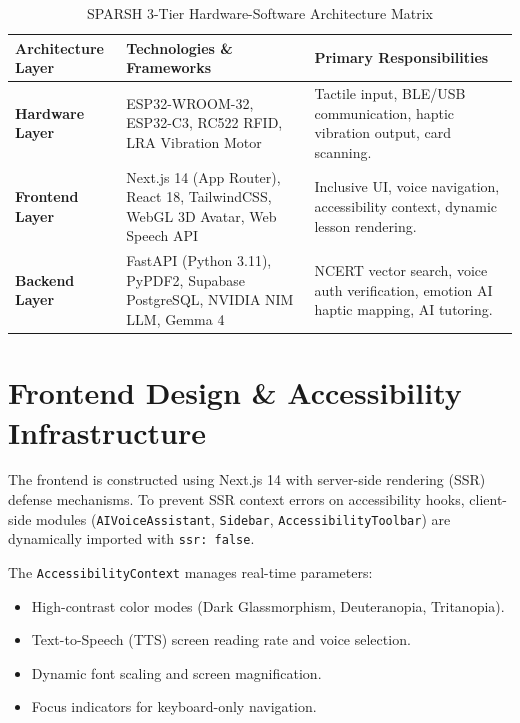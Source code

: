 \documentclass[12pt,a4paper]{report}
\begin{document}
\begin{table}[htbp]
    \centering
    \caption{SPARSH 3-Tier Hardware-Software Architecture Matrix}
    \vspace{0.2cm}
    \renewcommand{\arraystretch}{1.3}
    \begin{tabular}{|p{}|p{}|p{}|}
        \hline
        \textbf{Architecture Layer} & \textbf{Technologies \& Frameworks} & \textbf{Primary Responsibilities} \\ \hline
        \textbf{Hardware Layer} & ESP32-WROOM-32, ESP32-C3, RC522 RFID, LRA Vibration Motor & Tactile input, BLE/USB communication, haptic vibration output, card scanning. \\ \hline
        \textbf{Frontend Layer} & Next.js 14 (App Router), React 18, TailwindCSS, WebGL 3D Avatar, Web Speech API & Inclusive UI, voice navigation, accessibility context, dynamic lesson rendering. \\ \hline
        \textbf{Backend Layer} & FastAPI (Python 3.11), PyPDF2, Supabase PostgreSQL, NVIDIA NIM LLM, Gemma 4 & NCERT vector search, voice auth verification, emotion AI haptic mapping, AI tutoring. \\ \hline
    \end{tabular}
\end{table}

\section{Frontend Design \& Accessibility Infrastructure}
The frontend is constructed using Next.js 14 with server-side rendering (SSR) defense mechanisms. To prevent SSR context errors on accessibility hooks, client-side modules (\texttt{AIVoiceAssistant}, \texttt{Sidebar}, \texttt{AccessibilityToolbar}) are dynamically imported with \texttt{ssr: false}.

The \texttt{AccessibilityContext} manages real-time parameters:
\begin{itemize}
    \item High-contrast color modes (Dark Glassmorphism, Deuteranopia, Tritanopia).
    \item Text-to-Speech (TTS) screen reading rate and voice selection.
    \item Dynamic font scaling and screen magnification.
    \item Focus indicators for keyboard-only navigation.
\end{itemize}
\end{document}
